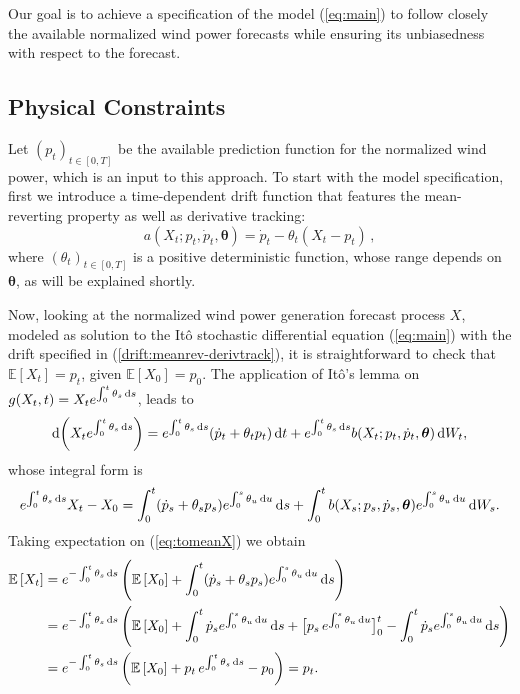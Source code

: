 \documentclass[11pt]{article}
\theoremstyle{definition}
\begin{document}
Our goal is to achieve a specification of the model (\ref{eq:main}) to follow closely the available normalized wind power forecasts while ensuring its unbiasedness with respect to the forecast. 

\subsection{Physical Constraints} \label{Physical_Constraints}

Let $(p_t)_{t \in [0,T]}$ be the available prediction function for the normalized wind power, which is an input to this approach. To start with the model specification, first we introduce a time-dependent drift function that features the mean-reverting property as well as derivative tracking:
\begin{equation}
a(X_t; p_t, \dot{p}_t, \bm{\theta}) = \dot{p}_t  - \theta_t (X_t - p_t)\,,  \label{drift:meanrev-derivtrack}
\end{equation} 
where $ (\theta_t)_{t \in [0,T]} $ is a positive deterministic function, whose range depends on $\bm{\theta}$, as will be explained shortly.

Now, looking at the normalized wind power generation forecast process $X$, modeled as solution to the It\^{o} stochastic differential equation (\ref{eq:main}) with the drift specified in (\ref{drift:meanrev-derivtrack}), it is straightforward to check that $\mathbb{E} \left[X_t\right] = p_t$, given $  \mathbb{E}\left[X_0\right] = p_0$. The application of  It\^{o}'s lemma on $g(X_t, t) = X_t e^{\int_{0}^{t} \theta_s \dif s}$, leads to 
\begin{equation*}
\dif \left( X_t e^{\int_{0}^{t} \theta_s \dif s} \right) = e^{\int_{0}^{t} \theta_s \dif s} (\dot{p}_t + \theta_t p_t ) \dif t  + e^{\int_{0}^{t} \theta_s \dif s}b (X_t; p_t, \dot{p}_t, \bm{\theta} ) \dif W_t,
\end{equation*}
whose integral form is
\begin{equation}
e^{\int_{0}^{t} \theta_s \dif s}  X_t - X_0 = \int_{0}^{t}  (\dot{p}_s + \theta_s p_s ) e^{\int_{0}^{s} \theta_u \dif u} \dif s + \int_{0}^{t}  b (X_s; p_s, \dot{p}_s, \bm{\theta} )  e^{\int_{0}^{s} \theta_u \dif u}\dif  W_s.   \label{eq:tomeanX}
\end{equation} 
Taking expectation on (\ref{eq:tomeanX}) we obtain
\begin{align}
\mathbb{E} \left[X_t\right] & = e^{ - \int_{0}^{t} \theta_s \dif s} \left(  \mathbb{E} \left[X_0\right] +   \int_{0}^{t}  (\dot{p}_s + \theta_s p_s ) e^{\int_{0}^{s} \theta_u \dif u} \dif s   \right) \nonumber \\ 
& =  e^{ - \int_{0}^{t} \theta_s \dif s} \left(  \mathbb{E} \left[X_0\right] +   \int_{0}^{t}  \dot{p}_s e^{\int_{0}^{s} \theta_u \dif u} \dif s +  \big[ p_s \, e^{\int_{0}^{s} \theta_u \dif u} \big]^{t}_0  - \int_{0}^{t}  \dot{p}_s e^{\int_{0}^{s} \theta_u \dif u} \dif s  \right) \nonumber \\
& =  e^{ - \int_{0}^{t} \theta_s \dif s} \left(  \mathbb{E}\left[ X_0\right] + p_t \, e^{ \int_{0}^{t} \theta_s \dif s} - p_0 \right) = p_t. \label{eq:meanX}
\end{align}
\end{document}
